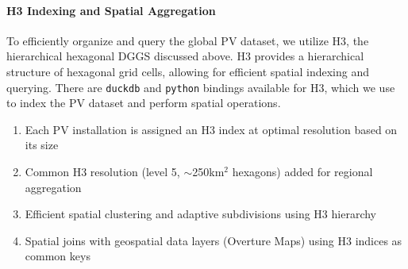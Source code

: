 \begin{multicols}{2}
\paragraph{H3 Indexing and Spatial Aggregation}
To efficiently organize and query the global PV dataset, we utilize H3, the hierarchical hexagonal DGGS discussed above.
H3 provides a hierarchical structure of hexagonal grid cells, allowing for efficient spatial indexing and querying. There are \texttt{duckdb} and \texttt{python} bindings available for H3,
which we use to index the PV dataset and perform spatial operations.
\begin{enumerate}
    \item Each PV installation is assigned an H3 index at optimal resolution based on its size
    \item Common H3 resolution (level 5, $\sim$250km$^2$ hexagons) added for regional aggregation
    \item Efficient spatial clustering and adaptive subdivisions using H3 hierarchy
    \item Spatial joins with geospatial data layers (Overture Maps) using H3 indices as common keys
\end{enumerate}




\end{multicols}
